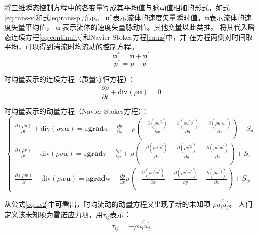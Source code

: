将三维瞬态控制方程中的各变量写成其平均值与脉动值相加的形式，如式
\eqref{eq:rans-v}和式\eqref{eq:rans-p}所示。
$\bm{u}^{*}$表示流体的速度矢量瞬时值，$\bm{u}$表示流体的速度矢量平均值，
$\bm{u}^{'}$表示流体的速度矢量脉动值。其他变量以此类推。
将其代入瞬态连续方程\eqref{eq:continuity}和Navier-Stokes方程\eqref{eq:ns}中，并
在方程两侧对时间取平均，可以得到湍流时均流动的控制方程。
\begin{equation}
  \label{eq:rans-v}
  \bm{u}^{*} = \bm{u} + \bm{u}^{'}
\end{equation}
\begin{equation}
  \label{eq:rans-p}
  p^{*} = p + p^{'}
\end{equation}

时均量表示的连续方程（质量守恒方程）：
\begin{equation}
  \label{eq:continuity2}
  \frac{\partial \rho}{\partial t} + \mathrm{div} (\rho \bm{u}) = 0
\end{equation}

时均量表示的动量方程（Navier-Stokes方程）：
\begin{equation}
  \label{eq:ns2}
  \begin{cases}
    \frac{\partial (\rho u)}{\partial t} + \mathrm{div}(\rho u \bm{u}) =
    \mathrm{\mu \bm{grad} u} - \frac{\partial p}{\partial x} +
    \rho \left( -\frac{\partial \left( \rho \overline{u^{'2}} \right)}{\partial x}
    -\frac{\partial \left( \rho \overline{u^{'}v^{'}} \right)}{\partial y}
    -\frac{\partial \left( \rho \overline{u^{'}w^{'}} \right)}{\partial z}\right)
    + S_u \\
    \frac{\partial (\rho v)}{\partial t} + \mathrm{div}(\rho v \bm{u}) =
    \mathrm{\mu \bm{grad} v} - \frac{\partial p}{\partial y} +
     \rho \left( -\frac{\partial \left( \rho \overline{u^{'}v^{'}} \right)}{\partial x}
    -\frac{\partial \left( \rho \overline{v^{'2}} \right)}{\partial y}
    -\frac{\partial \left( \rho \overline{v^{'}w^{'}} \right)}{\partial z}\right)
    + S_v \\
    \frac{\partial (\rho w)}{\partial t} + \mathrm{div}(\rho w \bm{u}) =
    \mathrm{\mu \bm{grad} w} - \frac{\partial p}{\partial x}
     \rho \left( -\frac{\partial \left( \rho \overline{u^{'}w^{'}} \right)}{\partial x}
    -\frac{\partial \left( \rho \overline{v^{'}w^{'}} \right)}{\partial y}
    -\frac{\partial \left( \rho \overline{w^{'2}} \right)}{\partial z}\right)
    + S_w
  \end{cases}
\end{equation}

从公式\eqref{eq:ns2}中可看出，时均流动的动量方程又出现了新的未知项
$\rho \overline{u_i^{'} u_j^{'}}$。
人们定义该未知项为雷诺应力项，用$\tau_{ij}$表示：
\begin{equation}
  \label{eq:reynolds}
  \tau_{ij} = -\rho \overline{u_i^{'} u_j^{'}}
\end{equation}

